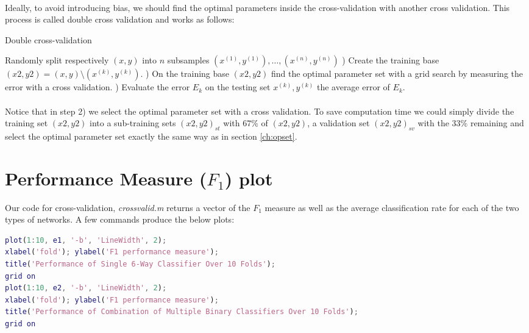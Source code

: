 \documentclass[a4paper,12pt,oneside,final]{report}
\newenvironment{changemargin}[2]{\begin{list}{}{%
\setlength{\topsep}{0pt}%
\setlength{\leftmargin}{0pt}%
\setlength{\rightmargin}{0pt}%
\setlength{\listparindent}{\parindent}%
\setlength{\itemindent}{\parindent}%
\setlength{\parsep}{0pt plus 1pt}%
\addtolength{\leftmargin}{#1}%
\addtolength{\rightmargin}{#2}%
}\item }{\end{list}}
\begin{document}
\paragraph{}
Ideally, to avoid introducing bias, we should find the optimal parameters inside the cross-validation with another cross validation. This process is called double cross validation and works as follows:
\begin{algorithm}[H]
\caption{Double cross-validation}
\label{al:dcv}
\begin{algorithmic}[1]
\STATE Randomly split respectively $(x, y)$ into $n$ subsamples $(x^{(1)}, y^{(1)}),\hdots,(x^{(n)}, y^{(n)})$
    ) Create the training base $(x2,y2)=(x, y)\setminus(x^{(k)}, y^{(k)})$.
    ) On the training base $(x2,y2)$ find the optimal parameter set with a grid search by measuring the error with a cross validation.
    ) Evaluate the error $E_k$ on the testing set $x^{(k)}, y^{(k)}$
\ENDFOR
{} the average error of $E_k$.
\end{algorithmic}
\end{algorithm}
\paragraph{}
Notice that in step 2) we select the optimal parameter set with a cross validation. To save computation time we could simply divide the training set $(x2,y2)$ into a sub-training sets $(x2,y2)_{st}$ with $67\%$ of $(x2,y2)$, a validation set $(x2,y2)_{sv}$ with the $33\%$ remaining and select the optimal parameter set exactly the same way as in section \ref{ch:opset}.

\section{Performance Measure ($F_1$) plot}
Our code for cross-validation, \textit{crossvalid.m} returns a vector of the $F_1$ measure as well as the average classification rate for each of the two types of networks.  A few commands produce the below plots:
\begin{changemargin}{-5mm}{-5mm}
\begin{lstlisting}[language=Matlab, frame=single]		
plot(1:10, e1, '-b', 'LineWidth', 2);
xlabel('fold'); ylabel('F1 performance measure');
title('Performance of Single 6-Way Classifier Over 10 Folds');
grid on
plot(1:10, e2, '-b', 'LineWidth', 2);
xlabel('fold'); ylabel('F1 performance measure');
title('Performance of Combination of Multiple Binary Classifiers Over 10 Folds');
grid on
\end{lstlisting}
\end{changemargin}
\end{document}
